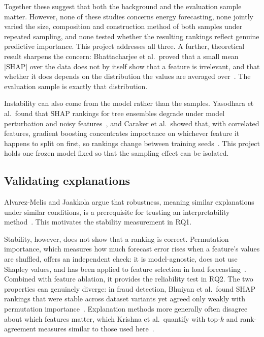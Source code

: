 \documentclass[11pt,a4paper]{article}
\begin{document}
Together these suggest that both the background and the evaluation sample matter. However, none of these studies concerns energy forecasting, none jointly varied the size, composition and construction method of both samples under repeated sampling, and none tested whether the resulting rankings reflect genuine predictive importance. This project addresses all three. A further, theoretical result sharpens the concern: Bhattacharjee et al.\ proved that a small mean $|\text{SHAP}|$ over the data does not by itself show that a feature is irrelevant, and that whether it does depends on the distribution the values are averaged over~\cite{bhattacharjee2025}. The evaluation sample is exactly that distribution.

Instability can also come from the model rather than the samples. Yasodhara et al.\ found that SHAP rankings for tree ensembles degrade under model perturbation and noisy features~\cite{yasodhara2021}, and Caraker et al.\ showed that, with correlated features, gradient boosting concentrates importance on whichever feature it happens to split on first, so rankings change between training seeds~\cite{caraker2026}. This project holds one frozen model fixed so that the sampling effect can be isolated.

\subsection{Validating explanations}

Alvarez-Melis and Jaakkola argue that robustness, meaning similar explanations under similar conditions, is a prerequisite for trusting an interpretability method~\cite{alvarezmelis2018}. This motivates the stability measurement in RQ1.

Stability, however, does not show that a ranking is correct. Permutation importance, which measures how much forecast error rises when a feature's values are shuffled, offers an independent check: it is model-agnostic, does not use Shapley values, and has been applied to feature selection in load forecasting~\cite{huang2016}. Combined with feature ablation, it provides the reliability test in RQ2. The two properties can genuinely diverge: in fraud detection, Bhuiyan et al.\ found SHAP rankings that were stable across dataset variants yet agreed only weakly with permutation importance~\cite{bhuiyan2026}. Explanation methods more generally often disagree about which features matter, which Krishna et al.\ quantify with top-$k$ and rank-agreement measures similar to those used here~\cite{krishna2022}.
\end{document}
